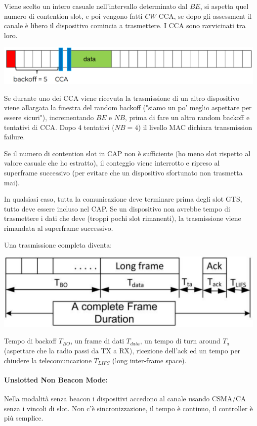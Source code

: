 Viene scelto un intero casuale nell'intervallo determinato dal $BE$, si aspetta quel numero di contention slot, e poi vengono fatti $CW$ CCA, se dopo gli assessment il canale è libero il dispositivo comincia a trasmettere. I CCA sono ravvicinati tra loro.

\begin{center}
	\includegraphics[width=0.9\linewidth]{img/wpan/zex1}
\end{center}

Se durante uno dei CCA viene ricevuta la trasmissione di un altro dispositivo viene allargata la finestra del random backoff ("siamo un po' meglio aspettare per essere sicuri"), incrementando $BE$ e $NB$, prima di fare un altro random backoff e tentativi di CCA. Dopo 4 tentativi ($NB=4$) il livello MAC dichiara transmission failure.

Se il numero di contention slot in CAP non è sufficiente (ho meno slot rispetto al valore casuale che ho estratto), il conteggio viene interrotto e ripreso al superframe successivo (per evitare che un dispositivo sfortunato non trasmetta mai).

In qualsiasi caso, tutta la comunicazione deve terminare prima degli slot GTS, tutto deve essere incluso nel CAP. Se un dispositivo non avrebbe tempo di trasmettere i dati che deve (troppi pochi slot rimanenti), la trasmissione viene rimandata al superframe successivo.

Una trasmissione completa diventa:
\begin{center}
	\includegraphics[width=0.7\linewidth]{img/wpan/ztran}
\end{center}
Tempo di backoff $T_{BO}$, un frame di dati $T_{data}$, un tempo di turn around $T_a$ (aspettare che la radio passi da TX a RX), ricezione dell'ack ed un tempo per chiudere la telecomuncazione $T_{LIFS}$ (long inter-frame space).

\paragraph{Unslotted Non Beacon Mode:} Nella modalità senza beacon i dispositivi accedono al canale usando CSMA/CA senza i vincoli di slot. Non c'è sincronizzazione, il tempo è continuo, il controller è più semplice.

